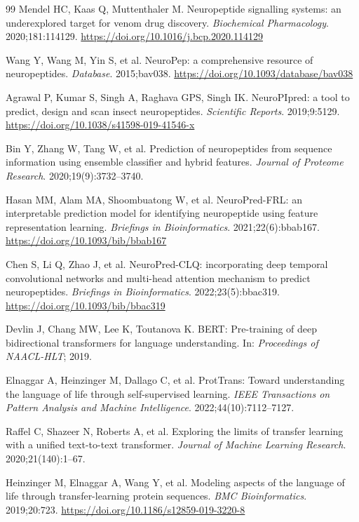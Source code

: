 \documentclass[11pt]{article}
\begin{document}
\begin{thebibliography}{99}
 Mendel HC, Kaas Q, Muttenthaler M. Neuropeptide signalling systems: an underexplored target for venom drug discovery. \textit{Biochemical Pharmacology}. 2020;181:114129. \url{https://doi.org/10.1016/j.bcp.2020.114129}

 Wang Y, Wang M, Yin S, et al. NeuroPep: a comprehensive resource of neuropeptides. \textit{Database}. 2015;bav038. \url{https://doi.org/10.1093/database/bav038}

 Agrawal P, Kumar S, Singh A, Raghava GPS, Singh IK. NeuroPIpred: a tool to predict, design and scan insect neuropeptides. \textit{Scientific Reports}. 2019;9:5129. \url{https://doi.org/10.1038/s41598-019-41546-x}

 Bin Y, Zhang W, Tang W, et al. Prediction of neuropeptides from sequence information using ensemble classifier and hybrid features. \textit{Journal of Proteome Research}. 2020;19(9):3732--3740.

 Hasan MM, Alam MA, Shoombuatong W, et al. NeuroPred-FRL: an interpretable prediction model for identifying neuropeptide using feature representation learning. \textit{Briefings in Bioinformatics}. 2021;22(6):bbab167. \url{https://doi.org/10.1093/bib/bbab167}

 Chen S, Li Q, Zhao J, et al. NeuroPred-CLQ: incorporating deep temporal convolutional networks and multi-head attention mechanism to predict neuropeptides. \textit{Briefings in Bioinformatics}. 2022;23(5):bbac319. \url{https://doi.org/10.1093/bib/bbac319}

 Devlin J, Chang MW, Lee K, Toutanova K. BERT: Pre-training of deep bidirectional transformers for language understanding. In: \textit{Proceedings of NAACL-HLT}; 2019.

 Elnaggar A, Heinzinger M, Dallago C, et al. ProtTrans: Toward understanding the language of life through self-supervised learning. \textit{IEEE Transactions on Pattern Analysis and Machine Intelligence}. 2022;44(10):7112--7127.

 Raffel C, Shazeer N, Roberts A, et al. Exploring the limits of transfer learning with a unified text-to-text transformer. \textit{Journal of Machine Learning Research}. 2020;21(140):1--67.

 Heinzinger M, Elnaggar A, Wang Y, et al. Modeling aspects of the language of life through transfer-learning protein sequences. \textit{BMC Bioinformatics}. 2019;20:723. \url{https://doi.org/10.1186/s12859-019-3220-8}


\end{thebibliography}
\end{document}

